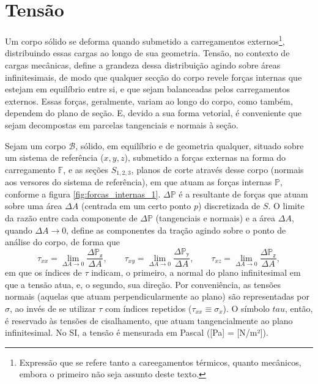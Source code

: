 \section{Tensão}
Um corpo sólido se deforma quando submetido a carregamentos externos\footnote{Expressão que se refere tanto a careegamentos térmicos, quanto mecânicos, embora o primeiro não seja assunto deste texto.}, distribuindo essas cargas ao longo de sua geometria. Tensão, no contexto de cargas mecânicas, define a grandeza dessa distribuição agindo sobre áreas infinitesimais, de modo que qualquer secção do corpo revele forças internas que estejam em equilíbrio entre si, e que sejam balanceadas pelos carregamentos externos. Essas forças, geralmente, variam ao longo do corpo, como também, dependem do plano de seção. E, devido a sua forma vetorial, é conveniente que sejam decompostas em parcelas tangenciais e normais à seção. \cite[pág. 60]{popov}



Sejam um corpo $\mathcal{B}$, sólido, em equilíbrio e de geometria qualquer, situado sobre um sistema de referência ($x, y, z$), submetido a forças externas na forma do carregamento $\mathbb{F}$, e as seções $S_{1,2,3}$, planos de corte através desse corpo (normais aos versores do sistema de referência), em que atuam as forças internas $\mathbb{P}$, conforme a figura \ref{fig:forcas_internas_1}. $\mathbb{\Delta P}$ é a resultante de forças que atuam sobre uma área $\Delta A$ (centrada em um certo ponto $p$) discretizada de $S$. O limite da razão entre cada componente de $\mathbb{\Delta P}$ (tangenciais e normais) e a área $\Delta A$, quando $\Delta A \to 0$, define as componentes da tração agindo sobre o ponto de análise do corpo, de forma que
\begin{equation}
    \tau_{xx} = \lim_{\Delta A \to 0} \frac{\mathbb{\Delta P_x}}{\Delta A}, \qquad
    \tau_{xy} = \lim_{\Delta A \to 0} \frac{\mathbb{\Delta P_y}}{\Delta A}, \qquad
    \tau_{xz} = \lim_{\Delta A \to 0} \frac{\mathbb{\Delta P_z}}{\Delta A},
\end{equation}
em que os índices de $\tau$ indicam, o primeiro, a normal do plano infinitesimal em que a tensão atua, e, o segundo, sua direção. Por conveniência, as tensões normais (aquelas que atuam perpendicularmente ao plano) são representadas por $\sigma$, ao invés de se utilizar $\tau$ com índices repetidos ($\tau_{xx} \equiv \sigma_x$). O símbolo $tau$, então, é reservado às tensões de cisalhamento, que atuam tangencialmente ao plano infinitesimal. No SI, a tensão é mensurada em Pascal ([Pa] = [N/m²]).

